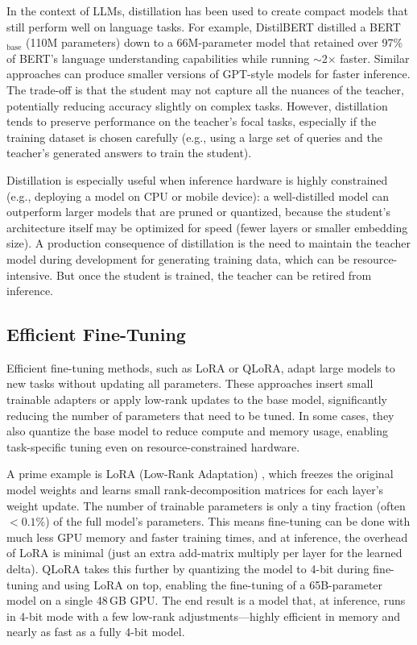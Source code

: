 In the context of LLMs, distillation has been used to create compact models that still perform well on language tasks. For example, DistilBERT \cite{Sanh2019DistilBERT} distilled a BERT$_{\text{base}}$ (110M parameters) down to a 66M-parameter model that retained over 97\% of BERT’s language understanding capabilities while running $\sim$2$\times$ faster. Similar approaches can produce smaller versions of GPT-style models for faster inference. The trade-off is that the student may not capture all the nuances of the teacher, potentially reducing accuracy slightly on complex tasks. However, distillation tends to preserve performance on the teacher’s focal tasks, especially if the training dataset is chosen carefully (e.g., using a large set of queries and the teacher’s generated answers to train the student).

Distillation is especially useful when inference hardware is highly constrained (e.g., deploying a model on CPU or mobile device): a well-distilled model can outperform larger models that are pruned or quantized, because the student’s architecture itself may be optimized for speed (fewer layers or smaller embedding size). A production consequence of distillation is the need to maintain the teacher model during development for generating training data, which can be resource-intensive. But once the student is trained, the teacher can be retired from inference.

\subsection{Efficient Fine-Tuning}
Efficient fine-tuning methods, such as LoRA or QLoRA, adapt large models to new tasks without updating all parameters. These approaches insert small trainable adapters or apply low-rank updates to the base model, significantly reducing the number of parameters that need to be tuned. In some cases, they also quantize the base model to reduce compute and memory usage, enabling task-specific tuning even on resource-constrained hardware.

A prime example is LoRA (Low-Rank Adaptation) \cite{Hu2022LoRA}, which freezes the original model weights and learns small rank-decomposition matrices for each layer’s weight update. The number of trainable parameters is only a tiny fraction (often $<0.1\%$) of the full model’s parameters. This means fine-tuning can be done with much less GPU memory and faster training times, and at inference, the overhead of LoRA is minimal (just an extra add-matrix multiply per layer for the learned delta). QLoRA \cite{Dettmers2023QLoRA} takes this further by quantizing the model to 4-bit during fine-tuning and using LoRA on top, enabling the fine-tuning of a 65B-parameter model on a single 48\,GB GPU. The end result is a model that, at inference, runs in 4-bit mode with a few low-rank adjustments---highly efficient in memory and nearly as fast as a fully 4-bit model.

